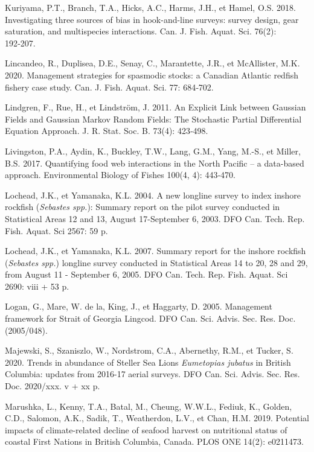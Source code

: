 \documentclass[french,11pt]{book}
\begin{document}
\leavevmode\hypertarget{ref-kuriyama2018}{}%
Kuriyama, P.T., Branch, T.A., Hicks, A.C., Harms, J.H., et Hamel, O.S. 2018. Investigating three sources of bias in hook-and-line surveys: survey design, gear saturation, and multispecies interactions. Can. J. Fish. Aquat. Sci. 76(2): 192‑207.

\leavevmode\hypertarget{ref-lincandeo2020}{}%
Lincandeo, R., Duplisea, D.E., Senay, C., Marantette, J.R., et McAllister, M.K. 2020. Management strategies for spasmodic stocks: a Canadian Atlantic redfish fishery case study. Can. J. Fish. Aquat. Sci. 77: 684‑702.

\leavevmode\hypertarget{ref-lindgren2011}{}%
Lindgren, F., Rue, H., et Lindström, J. 2011. An Explicit Link between Gaussian Fields and Gaussian Markov Random Fields: The Stochastic Partial Differential Equation Approach. J. R. Stat. Soc. B. 73(4): 423‑498.

\leavevmode\hypertarget{ref-livingston2017}{}%
Livingston, P.A., Aydin, K., Buckley, T.W., Lang, G.M., Yang, M.-S., et Miller, B.S. 2017. Quantifying food web interactions in the North Pacific -- a data-based approach. Environmental Biology of Fishes 100(4, 4): 443‑470.

\leavevmode\hypertarget{ref-lochead2004}{}%
Lochead, J.K., et Yamanaka, K.L. 2004. A new longline survey to index inshore rockfish (\emph{Sebastes spp.}): Summary report on the pilot survey conducted in Statistical Areas 12 and 13, August 17-September 6, 2003. DFO Can. Tech. Rep. Fish. Aquat. Sci 2567: 59 p.

\leavevmode\hypertarget{ref-lochead2007}{}%
Lochead, J.K., et Yamanaka, K.L. 2007. Summary report for the inshore rockfish (\emph{Sebastes spp.}) longline survey conducted in Statistical Areas 14 to 20, 28 and 29, from August 11 - September 6, 2005. DFO Can. Tech. Rep. Fish. Aquat. Sci 2690: viii + 53 p.

\leavevmode\hypertarget{ref-logan2005}{}%
Logan, G., Mare, W. de la, King, J., et Haggarty, D. 2005. Management framework for Strait of Georgia Lingcod. DFO Can. Sci. Advis. Sec. Res. Doc. (2005/048).

\leavevmode\hypertarget{ref-majewski2020}{}%
Majewski, S., Szaniszlo, W., Nordstrom, C.A., Abernethy, R.M., et Tucker, S. 2020. Trends in abundance of Steller Sea Lions \emph{Eumetopias jubatus} in British Columbia: updates from 2016-17 aerial surveys. DFO Can. Sci. Advis. Sec. Res. Doc. 2020/xxx. v + xx p.

\leavevmode\hypertarget{ref-marushka2019}{}%
Marushka, L., Kenny, T.A., Batal, M., Cheung, W.W.L., Fediuk, K., Golden, C.D., Salomon, A.K., Sadik, T., Weatherdon, L.V., et Chan, H.M. 2019. Potential impacts of climate-related decline of seafood harvest on nutritional status of coastal First Nations in British Columbia, Canada. PLOS ONE 14(2): e0211473.
\end{document}

